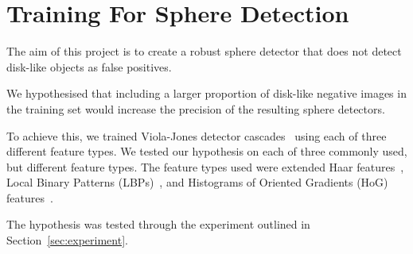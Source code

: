 \documentclass{sig-alternate-05-2015}
\newcommand{\citep}[1]{\cite{#1}}
\begin{document}
	\section{Training For Sphere Detection} {

		The aim of this project is to create a robust sphere detector that does not detect disk-like objects as false positives.

		We hypothesised that including a larger proportion of disk-like negative images in the training set would increase the precision of the resulting sphere detectors.

		To achieve this, we trained Viola-Jones detector cascades~\citep{viola2001rapid} using each of three different feature types. We tested our hypothesis on each of three commonly used, but different feature types. The feature types used were extended Haar features~\citep{Lienhart2002extended}, Local Binary Patterns (LBPs)~\citep{liao2007learning}, and Histograms of Oriented Gradients (HoG) features~\citep{dalal2005histograms}.

		The hypothesis was tested through the experiment outlined in Section~\ref{sec:experiment}.

	}
\end{document}
